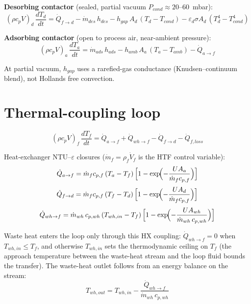 \documentclass[11pt]{article}
\begin{document}
\textbf{Desorbing contactor} (sealed, partial vacuum $P_{cond} \approx 20$--$60$~mbar):
\begin{equation}
(\rho c_p V)_{d}\,\frac{dT_d}{dt}
= \dot{Q}_{f\to d}
- \dot{m}_{des}\,h_{des}
- h_{gap}\,A_d\,(T_d - T_{cond})
- \varepsilon_d\sigma A_d\,(T_d^4 - T_{cond}^4)
\label{eq:desorbing}
\end{equation}

\textbf{Adsorbing contactor} (open to process air, near-ambient pressure):
\begin{equation}
(\rho c_p V)_{a}\,\frac{dT_a}{dt}
= \dot{m}_{ads}\,h_{ads}
- h_{amb}\,A_a\,(T_a - T_{amb})
- \dot{Q}_{a\to f}
\label{eq:adsorbing}
\end{equation}

At partial vacuum, $h_{gap}$ uses a rarefied-gas conductance (Knudsen--continuum blend), not Hollands free convection.

\section{Thermal-coupling loop}

\begin{equation}
(\rho c_p V)_{f}\,\frac{dT_f}{dt}
= \dot{Q}_{a\to f} + \dot{Q}_{wh\to f} - \dot{Q}_{f\to d} - \dot{Q}_{f,loss}
\label{eq:loop}
\end{equation}

Heat-exchanger NTU--$\varepsilon$ closures ($\dot{m}_f = \rho_f \dot{V}_f$ is the HTF control variable):
\begin{equation}
\dot{Q}_{a\to f} = \dot{m}_f c_{p,f}\,(T_a - T_f)\,\Bigl[1-\exp\!\Bigl(-\frac{UA_a}{\dot{m}_f c_{p,f}}\Bigr)\Bigr]
\label{eq:Qaf}
\end{equation}
\begin{equation}
\dot{Q}_{f\to d} = \dot{m}_f c_{p,f}\,(T_f - T_d)\,\Bigl[1-\exp\!\Bigl(-\frac{UA_d}{\dot{m}_f c_{p,f}}\Bigr)\Bigr]
\label{eq:Qfd}
\end{equation}
\begin{equation}
\dot{Q}_{wh\to f} = \dot{m}_{wh}\,c_{p,wh}\,(T_{wh,in} - T_{f})\,\Bigl[1-\exp\!\Bigl(-\frac{UA_{wh}}{\dot{m}_{wh}\,c_{p,wh}}\Bigr)\Bigr]
\label{eq:Qwhf}
\end{equation}

Waste heat enters the loop only through this HX coupling: $\dot{Q}_{wh\to f} = 0$ when $T_{wh,in} \le T_f$, and otherwise $T_{wh,in}$ sets the thermodynamic ceiling on $T_f$ (the approach temperature between the waste-heat stream and the loop fluid bounds the transfer). The waste-heat outlet follows from an energy balance on the stream:
\begin{equation}
T_{wh,out} = T_{wh,in} - \frac{\dot{Q}_{wh\to f}}{\dot{m}_{wh}\,c_{p,wh}}
\end{equation}
\end{document}
